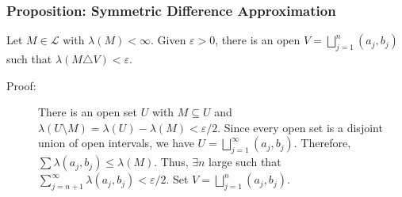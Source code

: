 \documentclass[9pt]{extarticle}
\begin{document}
  \subsubsection{Proposition: Symmetric Difference Approximation}%
  Let $M\in\mathcal{L}$ with $\lambda(M) < \infty$. Given $\varepsilon > 0$, there is an open $V = \bigsqcup_{j=1}^{n}(a_j,b_j)$ such that $\lambda(M\triangle V) < \varepsilon$.
  \begin{description}
    \item[Proof:] There is an open set $U$ with $M\subseteq U$ and $\lambda(U\setminus M) = \lambda(U) - \lambda(M) < \varepsilon/2$. Since every open set is a disjoint union of open intervals, we have $U = \bigsqcup_{j=1}^{\infty}(a_j,b_j)$. Therefore, $\sum \lambda(a_j,b_j) \leq \lambda(M)$. Thus, $\exists n$ large such that $\sum_{j=n+1}^{\infty}\lambda(a_j,b_j) < \varepsilon/2$. Set $V = \bigsqcup_{j=1}^{n}(a_j,b_j)$.
  \end{description}
\end{document}
